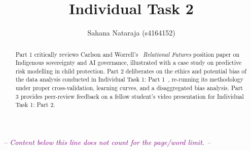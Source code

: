 \documentclass[manuscript,screen,review,nonacm]{acmart}
\begin{document}
\title{Individual Task 2}

\author{Sahana Nataraja (s4164152)}

\renewcommand{\shortauthors}{Nataraja}

\begin{abstract}
  Part 1 critically reviews Carlson and Worrell's~\cite{carlson2026relational} \emph{Relational
  Futures} position paper on Indigenous sovereignty and AI governance, illustrated with a case
  study on predictive risk modelling in child protection. Part 2 deliberates on the ethics and
  potential bias of the data analysis conducted in Individual Task 1: Part
  1~\cite{nataraja2026task1}, re-running its methodology under proper cross-validation, learning
  curves, and a disaggregated bias analysis. Part 3 provides peer-review feedback on a fellow
  student's video presentation for Individual Task 1: Part 2.
\end{abstract}

\maketitle



\clearpage


\clearpage


\clearpage
\begin{center}
    \noindent \textcolor{purple}{\emph{-- Content below this line does not count for the page/word limit. --}}
\end{center}
\end{document}
